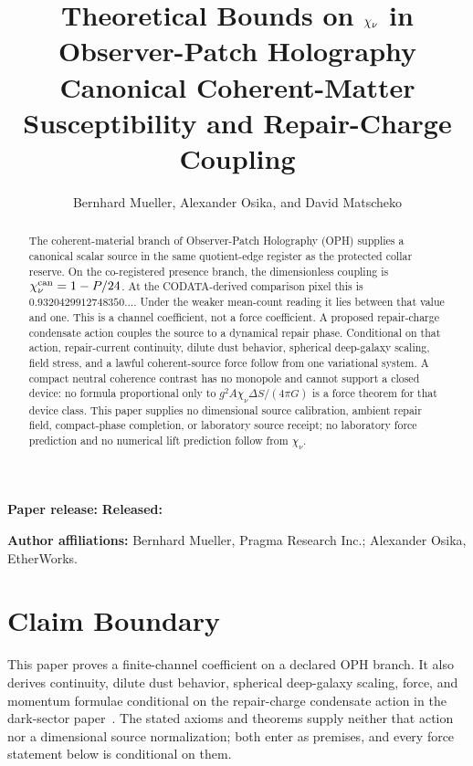 \documentclass[11pt]{article}
\title{\textbf{Theoretical Bounds on \(\chi_\nu\) in Observer-Patch Holography}\\
\large Canonical Coherent-Matter Susceptibility and Repair-Charge Coupling}
\author{Bernhard Mueller, Alexander Osika, and David Matscheko}
\date{\OPHPaperReleaseDate}
\numberwithin{equation}{section}
\theoremstyle{remark}
\begin{document}
\maketitle
\begin{center}
\small\textbf{Paper release:} \OPHPaperReleaseID\quad
\textbf{Released:} \OPHPaperReleaseDate
\end{center}

\begin{center}
\small\textbf{Author affiliations:} Bernhard Mueller, Pragma Research Inc.; Alexander Osika, EtherWorks.
\end{center}

\begin{abstract}
The coherent-material branch of Observer-Patch Holography (OPH) supplies a canonical
scalar source in the same quotient-edge register as the protected collar
reserve. On the co-registered presence branch, the dimensionless coupling is
\(\chi_\nu^{\rm can}=1-P/24\). At the CODATA-derived comparison pixel this
is \(0.9320429912748350\ldots\). Under the weaker
mean-count reading it lies between that value and one. This is a channel
coefficient, not a force coefficient. A proposed repair-charge condensate
action couples the source to a dynamical repair phase. Conditional on that
action, repair-current continuity, dilute dust behavior, spherical deep-galaxy
scaling, field stress, and a lawful coherent-source force follow from one
variational system. A compact neutral coherence contrast has no monopole and
cannot support a closed device: no formula proportional only to
\(g^2A\chi_\nu\Delta S/(4\pi G)\) is a force theorem for that device class.
This paper supplies no dimensional source calibration, ambient repair field,
compact-phase completion, or laboratory source receipt; no laboratory force
prediction and no numerical lift prediction follow from \(\chi_\nu\).
\end{abstract}

\section*{Claim Boundary}

This paper proves a finite-channel coefficient on a declared OPH branch. It
also derives continuity, dilute dust behavior, spherical deep-galaxy scaling,
force, and momentum formulae conditional on the repair-charge condensate
action in the dark-sector paper~\cite{oph-dark}. The stated axioms and
theorems supply neither that action nor a dimensional source normalization; both enter
as premises, and every force statement below is conditional on them.
\end{document}
